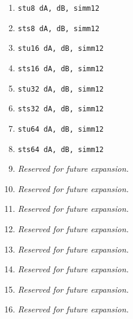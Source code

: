 \documentclass{article}
\begin{document}
\begin{itemize}
\begin{enumerate}
			\item \texttt{stu8 dA, dB, simm12}
			\item \texttt{sts8 dA, dB, simm12}
			\item \texttt{stu16 dA, dB, simm12}
			\item \texttt{sts16 dA, dB, simm12}

			\item \texttt{stu32 dA, dB, simm12}
			\item \texttt{sts32 dA, dB, simm12}
			\item \texttt{stu64 dA, dB, simm12}
			\item \texttt{sts64 dA, dB, simm12}

			\item \textit{Reserved for future expansion.}
			\item \textit{Reserved for future expansion.}
			\item \textit{Reserved for future expansion.}
			\item \textit{Reserved for future expansion.}

			\item \textit{Reserved for future expansion.}
			\item \textit{Reserved for future expansion.}
			\item \textit{Reserved for future expansion.}
			\item \textit{Reserved for future expansion.}
			\end{enumerate}
		\end{itemize}
		\newpage
\end{document}
